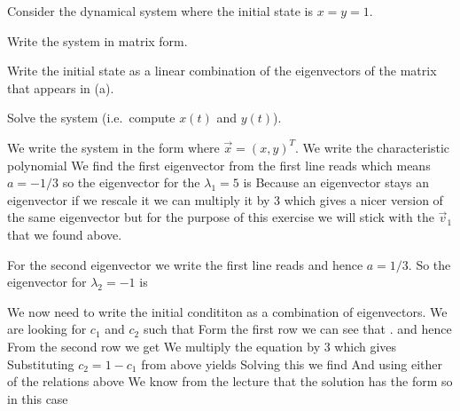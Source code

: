 
Consider the dynamical system 
where the initial state is $x=y=1$.

\subquestion
Write the system in matrix form. 

\subquestion 
Write the initial state as a linear combination of the eigenvectors of the matrix that appears in (a). 

\subquestion
Solve the system (i.e.~compute $x(t)$ and $y(t)$).

\solution
We write the system in the form 
where $\vec{x}=(x,y)^T$. We write the characteristic polynomial 
We find the first eigenvector from 
the first line reads 
which means $a=-1/3$ so the eigenvector for the $\lambda_1=5$ is 
Because an eigenvector stays an eigenvector if we rescale it we can multiply it by 3 which gives a nicer version of the same eigenvector
but for the purpose of this exercise we will stick with the $\vec{v}_1$ that we found above. 

For the second eigenvector we write 
the first line reads 
and hence $a=1/3$. So the eigenvector for $\lambda_2=-1$ is 

We now need to write the initial condititon as a combination of eigenvectors. We are looking for $c_1$ and $c_2$ such that
Form the first row we can see that 
.
and hence 
From the second row we get 
We multiply the equation by 3 which gives
Substituting $c_2=1-c_1$ from above yields
Solving this we find 
And using either of the relations above 
We know from the lecture that the solution has the form
so in this case 

